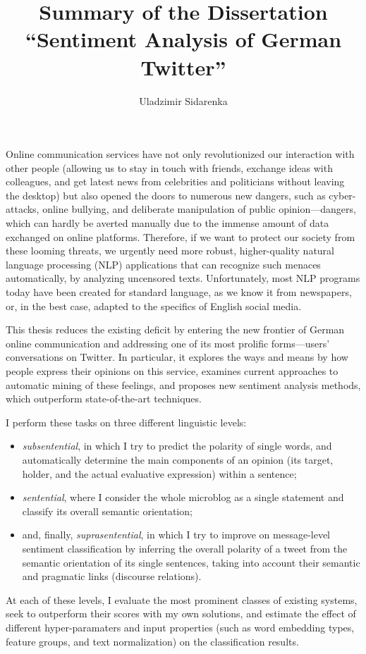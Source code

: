 \documentclass[11pt]{article}
\author{Uladzimir Sidarenka}
\title{  {\large Summary of the Dissertation}\\[0.5em]
  {\Large ``Sentiment Analysis of German Twitter''}}
\date{\vspace{-3ex}}
\begin{document}
\maketitle

Online communication services have not only revolutionized our
interaction with other people (allowing us to stay in touch with
friends, exchange ideas with colleagues, and get latest news from
celebrities and politicians without leaving the desktop) but also
opened the doors to numerous new dangers, such as cyber-attacks,
online bullying, and deliberate manipulation of public
opinion---dangers, which can hardly be averted manually due to the
immense amount of data exchanged on online platforms.  Therefore, if
we want to protect our society from these looming threats, we urgently
need more robust, higher-quality natural language processing (NLP)
applications that can recognize such menaces automatically, by
analyzing uncensored texts.  Unfortunately, most NLP programs today
have been created for standard language, as we know it from
newspapers, or, in the best case, adapted to the specifics of English
social media.

This thesis reduces the existing deficit by entering the new frontier
of German online communication and addressing one of its most prolific
forms---users' conversations on Twitter.  In particular, it explores
the ways and means by how people express their opinions on this
service, examines current approaches to automatic mining of these
feelings, and proposes new sentiment analysis methods, which
outperform state-of-the-art techniques.

I perform these tasks on three different linguistic levels:
\begin{itemize}
  \item\emph{subsentential}, in which I try to predict the polarity of
    single words, and automatically determine the main components of
    an opinion (its target, holder, and the actual evaluative
    expression) within a sentence;

  \item\emph{sentential}, where I consider the whole microblog as a
    single statement and classify its overall semantic orientation;

  \item and, finally, \emph{suprasentential}, in which I try to
    improve on message-level sentiment classification by inferring the
    overall polarity of a tweet from the semantic orientation of its
    single sentences, taking into account their semantic and pragmatic
    links (discourse relations).
\end{itemize}
At each of these levels, I evaluate the most prominent classes of
existing systems, seek to outperform their scores with my own
solutions, and estimate the effect of different hyper-paramaters and
input properties (such as word embedding types, feature groups, and
text normalization) on the classification results.
\end{document}
